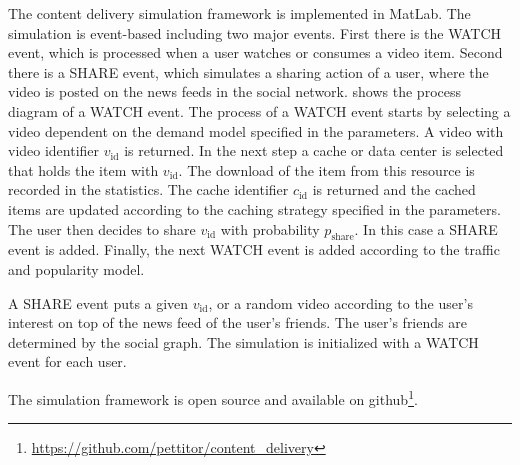 The content delivery simulation framework is implemented in MatLab.
The simulation is event-based including two major events.
First there is the WATCH event, which is processed when a user watches or consumes a video item.
Second there is a SHARE event, which simulates a sharing action of a user, where the video is posted on the news feeds in the social network.
 shows the process diagram of a WATCH event.
The process of a WATCH event starts by selecting a video dependent on the demand model specified in the parameters.
A video with video identifier $v_\text{id}$ is returned.
In the next step a cache or data center is selected that holds the item with $v_\text{id}$.
The download of the item from this resource is recorded in the statistics.
The cache identifier $c_\text{id}$ is returned and the cached items are updated according to the caching strategy specified in the parameters.
The user then decides to share $v_\text{id}$ with probability $p_\text{share}$.
In this case a SHARE event is added.
Finally, the next WATCH event is added according to the traffic and popularity model.

A SHARE event puts a given $v_\text{id}$, or a random video according to the user's interest on top of the news feed of the user's friends.
The user's friends are determined by the social graph.
The simulation is initialized with a WATCH event for each user.

The simulation framework is open source and available on github\footnote{\url{https://github.com/pettitor/content_delivery}}.
